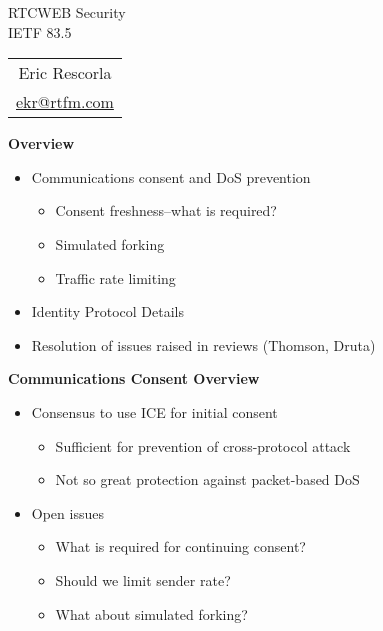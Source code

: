 \documentclass[helvetica]{seminar}
\newcommand{\heading}[1]{%
  \begin{center} 
    \large\bf 
    #1 
  \end{center} 
  \vspace{.4 in}}
\begin{document}
\centerslidestrue

\begin{slide}
\begin{center}
\vspace{1 in}
\LARGE{{\bf}RTCWEB Security}\\
\vspace{.2in}
\large{{IETF 83.5}} \\
\vspace{3em}
\large{
\begin{tabular}{c}
Eric Rescorla \\
\url{ekr@rtfm.com}
\end{tabular}
}
\end{center}
\end{slide}

\centerslidesfalse


\begin{slide}
\heading{Overview}

\begin{itemize}
\item Communications consent and DoS prevention
  \begin{itemize}
  \item Consent freshness--what is required?
  \item Simulated forking
  \item Traffic rate limiting
  \end{itemize}

\item Identity Protocol Details

\item Resolution of issues raised in reviews (Thomson, Druta)
\end{itemize}

\end{slide}


\begin{slide}
\heading{Communications Consent Overview}

\begin{itemize}
\item Consensus to use ICE for initial consent
  \begin{itemize}
  \item Sufficient for prevention of cross-protocol attack
  \item Not so great protection against packet-based DoS
  \end{itemize}

\item Open issues
  \begin{itemize}
  \item What is required for continuing consent?
  \item Should we limit sender rate?
  \item What about simulated forking?
  \end{itemize}
\end{itemize}
\end{slide}
\end{document}
